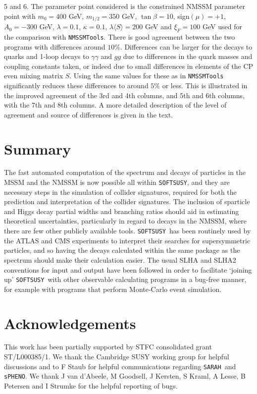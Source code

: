 \documentclass[final,3p,times]{elsarticle}
\def\code#1{{\tt #1}}
\begin{document}
\begin{center}
\begin{table}
{  5 and 6. The 
  parameter point considered is the
constrained NMSSM
  parameter point  with $m_0 =
  400$ GeV, $m_{1/2} = 350$ GeV, 
  $\tan\beta = 10$, sign$(\mu) = +1$, $A_0 = -300$ GeV, $\lambda = 0.1$,
  $\kappa = 
  0.1$, $\lambda \langle S \rangle = 200$ GeV and $\xi_F = 100$ GeV
used for the comparison with {\tt NMSSMTools}.
There is good agreement between the two
  programs with differences around $10\%$. Differences can be larger for the
  decays to quarks and 1-loop decays to $\gamma \gamma$ and $gg$ due to
  differences in the quark masses and coupling constants taken, or indeed due to small
  differences in elements of the CP even mixing matrix $S$. Using the same
  values for these as in {\tt NMSSMTools} significantly reduces these
  differences to around $5\%$ or less. This is illustrated in the improved
  agreement of the 3rd 
  and 4th columns, and 5th and 6th columns, with the 7th and 8th columns. A
  more detailed description of 
  the level of agreement and source of differences is given in the text.} 
\label{nmssmSLHAnoZ3Inputspctable}
\end{table}
\end{center}
       



\section{Summary} \label{sec:sum}
The fast automated computation of the spectrum and decays of particles in the
MSSM and the NMSSM is now possible all within \code{SOFTSUSY}, and they are
necessary steps in the simulation of collider signatures, required for both
the prediction and interpretation of the collider signatures. The inclusion
of sparticle and Higgs decay partial widths and branching ratios should aid in
estimating 
theoretical uncertainties, particularly in regard to decays in the NMSSM,
where there are few other publicly available tools. 
\code{SOFTSUSY}~has been routinely used by the ATLAS and CMS experiments to
interpret their searches for supersymmetric particles, and so having the
decays calculated within the same package as the spectrum should make their
calculation easier. 
The usual SLHA and SLHA2
conventions for input and output have been followed in order to facilitate
`joining up' \code{SOFTSUSY}~with other observable calculating programs in a
bug-free manner, for example with programs that perform Monte-Carlo event
simulation. 

\section*{Acknowledgements}
This work has been partially supported by STFC consolidated grant 
ST/L000385/1. We thank the Cambridge SUSY working group for helpful
discussions and to F Staub for helpful communications regarding
\code{SARAH}~and \code{sPHENO}. We thank J van d'Abeele, M
Goodsell, J Kersten, S Kraml, A Lesse, B Petersen 
and I Strumke for the helpful reporting
of bugs. 
\end{document}

